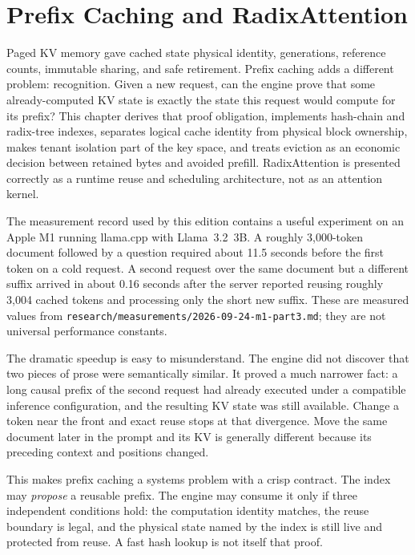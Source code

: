 \chapter{Prefix Caching and RadixAttention}\label{ch:prefix-caching}

\begin{ChapterIntent}
Paged KV memory gave cached state physical identity, generations, reference counts,
immutable sharing, and safe retirement. Prefix caching adds a different problem:
recognition. Given a new request, can the engine prove that some already-computed KV
state is exactly the state this request would compute for its prefix? This chapter
derives that proof obligation, implements hash-chain and radix-tree indexes, separates
logical cache identity from physical block ownership, makes tenant isolation part of
the key space, and treats eviction as an economic decision between retained bytes and
avoided prefill. RadixAttention is presented correctly as a runtime reuse and
scheduling architecture, not as an attention kernel.
\end{ChapterIntent}


The measurement record used by this edition contains a useful experiment on an Apple
M1 running llama.cpp with Llama~3.2~3B. A roughly 3,000-token document followed by a
question required about 11.5 seconds before the first token on a cold request. A
second request over the same document but a different suffix arrived in about
0.16 seconds after the server reported reusing roughly 3,004 cached tokens and
processing only the short new suffix. These are measured values from
\texttt{research/measurements/2026-09-24-m1-part3.md}; they are not universal
performance constants.

The dramatic speedup is easy to misunderstand. The engine did not discover that two
pieces of prose were semantically similar. It proved a much narrower fact: a long
causal prefix of the second request had already executed under a compatible inference
configuration, and the resulting KV state was still available. Change a token near
the front and exact reuse stops at that divergence. Move the same document later in
the prompt and its KV is generally different because its preceding context and
positions changed.

This makes prefix caching a systems problem with a crisp contract. The index may
\emph{propose} a reusable prefix. The engine may consume it only if three independent
conditions hold: the computation identity matches, the reuse boundary is legal, and
the physical state named by the index is still live and protected from reuse. A fast
hash lookup is not itself that proof.

